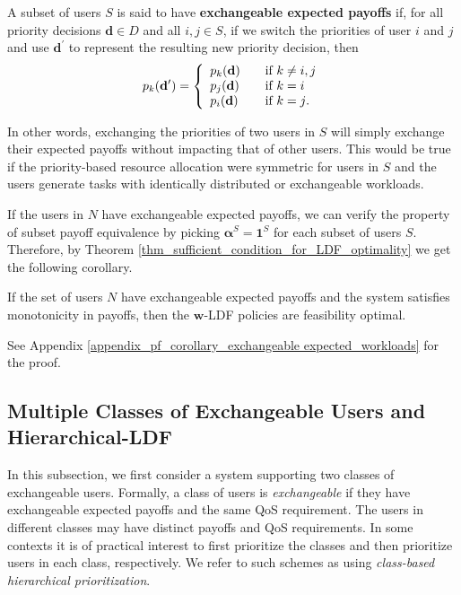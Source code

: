 \documentclass[prodmode,acmtompecs]{acmsmall}
\newcommand{\fullUserSet}{N}
\begin{document}
\begin{definition}
A subset of users $S$ is said to have {\bf exchangeable expected payoffs} if, for all priority decisions $\mathbf{d} \in D$ and all $i, j\in S$, if we switch the priorities of user $i$ and $j$ and use $\mathbf{d}^\prime$ to represent the resulting new priority decision, then
$$
p_k(\mathbf{d}^\prime) = \left\{ 
   \begin{array}{l l}
     p_k(\mathbf{d}) & \quad \text{if $k \neq i,j$}	\\
     p_j(\mathbf{d}) & \quad \text{if $k = i$}	\\
     p_i(\mathbf{d}) & \quad \text{if $k = j$}. 	\\
   \end{array} \right.
$$
\end{definition}
In other words, exchanging the priorities of two users in $S$ will simply exchange their expected payoffs without impacting that of other users. 
This would be true if the priority-based resource allocation were symmetric for users in $S$ and the users generate tasks with identically distributed or exchangeable workloads. 

If the users in $\fullUserSet$ have exchangeable expected payoffs, we can verify the property of subset payoff equivalence by picking $\boldsymbol{\alpha}^S = \mathbf{1}^S$ for each subset of users $S$.
Therefore, by Theorem \ref{thm_sufficient_condition_for_LDF_optimality} we get the following corollary. 

\begin{corollary}
\label{corollary_exchangeable expected_workloads}
If the set of users $\fullUserSet$ have exchangeable expected payoffs and the system satisfies monotonicity in payoffs, then the $\mathbf{w}$-LDF policies are feasibility optimal. 
\end{corollary}

\noindent See Appendix \ref{appendix_pf_corollary_exchangeable expected_workloads} for the proof. 

\subsection{Multiple Classes of Exchangeable Users and Hierarchical-LDF}
\label{subsection_multiple_classes_of_users}
In this subsection, we first consider a system supporting two classes of exchangeable users. 
Formally, a class of users is {\em exchangeable} if they have exchangeable expected payoffs and the same QoS requirement. 
The users in different classes may have distinct payoffs and QoS requirements. 
In some contexts it is of practical interest to first prioritize the classes and then prioritize users in each class, respectively. We refer to such schemes as using {\em class-based hierarchical prioritization}. 
\end{document}

